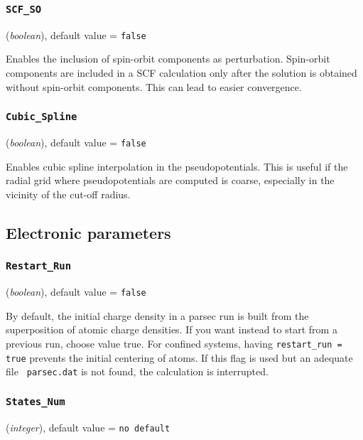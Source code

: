 \documentclass{article}
\begin{document}
\subsubsection{\tt SCF\_SO 
\label{SCFSO}}
({\it boolean}),
default value = {\tt false }

Enables the inclusion of spin-orbit components as
perturbation. Spin-orbit components are included in a SCF calculation
only after the solution is obtained without spin-orbit
components. This can lead to easier convergence.

\subsubsection{\tt Cubic\_Spline 
\label{CubicSpline}}
({\it boolean}),
default value = {\tt false }

Enables cubic spline interpolation in the pseudopotentials. This is
useful if the radial grid where pseudopotentials are computed is
coarse, especially in the vicinity of the cut-off radius.












\subsection{Electronic parameters}

\subsubsection{\tt Restart\_Run 
\label{RestartRun}}
({\it boolean}),
default value = {\tt false}

By default, the initial charge density in a parsec run is built from
the superposition of atomic charge densities. If you want instead to
start from a previous run, choose value true.
For confined systems, having {\tt restart\_run = true} prevents the initial
centering of atoms. If this flag is used but an adequate file {\tt
  parsec.dat} is not found, the calculation is interrupted.

\subsubsection{\tt States\_Num 
\label{StatesNum}}
({\it integer}),
default value = {\tt no default }
\end{document}
